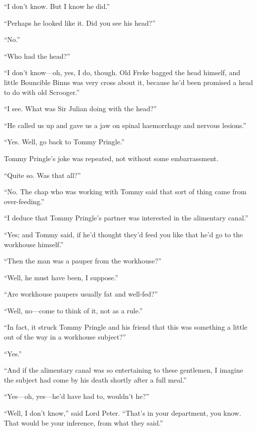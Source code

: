 \enquote{I don’t know. But I know he did.}

\enquote{Perhaps he looked like it. Did you see his head?}

\enquote{No.}

\enquote{Who had the head?}

\enquote{I don’t know\allowbreak---\allowbreak oh, yes, I do, though. Old Freke bagged the head himself, and little Bouncible Binns was very cross about it, because he’d been promised a head to do with old Scrooger.}

\enquote{I see. What was Sir Julian doing with the head?}

\enquote{He called us up and gave us a jaw on spinal haemorrhage and nervous lesions.}

\enquote{Yes. Well, go back to Tommy Pringle.}

Tommy Pringle’s joke was repeated, not without some embarrassment.

\enquote{Quite so. Was that all?}

\enquote{No. The chap who was working with Tommy said that sort of thing came from over-feeding.}

\enquote{I deduce that Tommy Pringle’s partner was interested in the alimentary canal.}

\enquote{Yes; and Tommy said, if he’d thought they’d feed you like that he’d go to the workhouse himself.}

\enquote{Then the man was a pauper from the workhouse?}

\enquote{Well, he must have been, I suppose.}

\enquote{Are workhouse paupers usually fat and well-fed?}

\enquote{Well, no\allowbreak---\allowbreak come to think of it, not as a rule.}

\enquote{In fact, it struck Tommy Pringle and his friend that this was something a little out of the way in a workhouse subject?}

\enquote{Yes.}

\enquote{And if the alimentary canal was so entertaining to these gentlemen, I imagine the subject had come by his death shortly after a full meal.}

\enquote{Yes\allowbreak---\allowbreak oh, yes\allowbreak---\allowbreak he’d have had to, wouldn’t he?}

\enquote{Well, I don’t know,} said Lord Peter. \enquote{That’s in your department, you know. That would be your inference, from what they said.}

